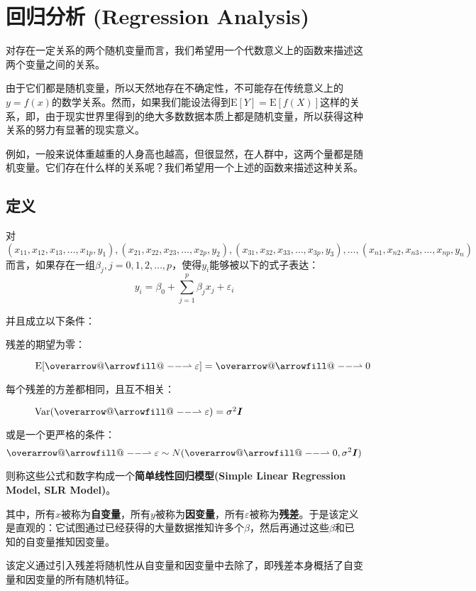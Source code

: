 \documentclass[UTF8]{ctexbook}
\makeatletter
\newcommand*{\overrightharpoonup}{\mathpalette{\overarrow@\rightharpoonupfill@}}
\newcommand*{\rightharpoonupfill@}{\arrowfill@\relbar\relbar\rightharpoonup}
\let\Vector\overrightharpoonup
\makeatother
\begin{document}
\chapter{回归分析 (Regression Analysis)}
对存在一定关系的两个随机变量而言，我们希望用一个代数意义上的函数来描述这两个变量之间的关系。

由于它们都是随机变量，所以天然地存在不确定性，不可能存在传统意义上的$y=f(x)$的数学关系。然而，如果我们能设法得到$\mathrm E[Y]=\mathrm E[f(X)]$这样的关系，即，由于现实世界里得到的绝大多数数据本质上都是随机变量，所以获得这种关系的努力有显著的现实意义。

例如，一般来说体重越重的人身高也越高，但很显然，在人群中，这两个量都是随机变量。它们存在什么样的关系呢？我们希望用一个上述的函数来描述这种关系。

\section{定义}
对$(x_{11},x_{12}, x_{13}, \dots, x_{1p},y_1),(x_{21}, x_{22}, x_{23}, \dots, x_{2p}, y_2),(x_{31},x_{32}, x_{33}, \dots, x_{3p}, y_3), \dots,(x_{n1}, x_{n2}, x_{n3}, \dots, x_{np},y_n)$而言，如果存在一组$\beta_j, j=0,1,2,\dots, p$，使得$y_i$能够被以下的式子表达：
\[
y_i=\beta_0+\sum_{j=1}^p\beta_jx_j+\varepsilon_i
\]

并且成立以下条件：
\begin{description}
	\item [残差的期望为零：]$\mathrm E[\Vector{\varepsilon}]=\Vector{0}$
	\item [每个残差的方差都相同，且互不相关：]$\mathrm{Var}(\Vector{\varepsilon})=\sigma^2\boldsymbol{I}$
\end{description}

或是一个更严格的条件：
\[
	\Vector{\varepsilon}\sim N(\Vector{0}, \sigma^2\boldsymbol{I})
\]

则称这些公式和数字构成一个\textbf{简单线性回归模型(Simple Linear Regression Model, SLR Model)}。

其中，所有$x$被称为\textbf{自变量}，所有$y$被称为\textbf{因变量}，所有$\varepsilon$被称为\textbf{残差}。于是该定义是直观的：它试图通过已经获得的大量数据推知许多个$\beta$，然后再通过这些$\beta$和已知的自变量推知因变量。

该定义通过引入残差将随机性从自变量和因变量中去除了，即残差本身概括了自变量和因变量的所有随机特征。
\end{document}
